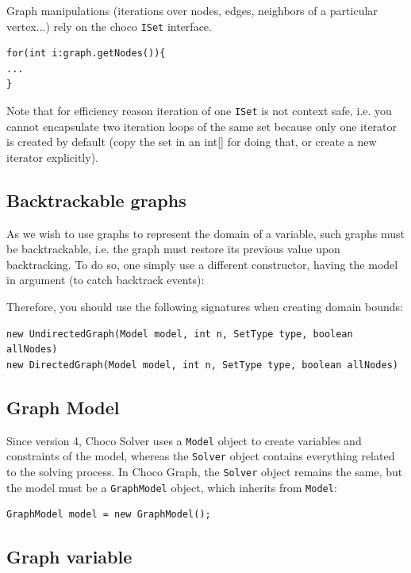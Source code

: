 \documentclass{article}
\begin{document}
Graph manipulations (iterations over nodes, edges, neighbors of a particular vertex...) rely on the choco \texttt{ISet} interface. 
\begin{lstlisting}
for(int i:graph.getNodes()){
...
}
\end{lstlisting}
Note that for efficiency reason iteration of one \texttt{ISet} is not context safe, i.e. you cannot encapsulate two iteration loops of the same set because only one iterator is created by default (copy the set in an int[] for doing that, or create a new iterator explicitly).
\subsection{Backtrackable graphs}

As we wish to use graphs to represent the domain of a variable, such graphs must be backtrackable, i.e. the graph must restore its previous value upon backtracking. 
To do so, one simply use a different constructor, having the model in argument (to catch backtrack events):

Therefore, you should use the following signatures when creating domain bounds:
\begin{lstlisting}
new UndirectedGraph(Model model, int n, SetType type, boolean allNodes)
new DirectedGraph(Model model, int n, SetType type, boolean allNodes)
\end{lstlisting}

\subsection{Graph Model}

Since version 4, Choco Solver uses a \texttt{Model} object to create variables and constraints of the model, whereas the \texttt{Solver} object contains everything related to the solving process. In Choco Graph, the \texttt{Solver} object remains the same, but the model must be a \texttt{GraphModel} object, which inherits from \texttt{Model}:

\begin{lstlisting}
GraphModel model = new GraphModel();
\end{lstlisting}

\subsection{Graph variable}
\end{document}

